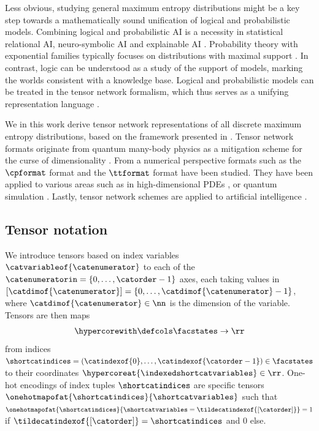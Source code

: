 Less obvious, studying general maximum entropy distributions might be a key step towards a mathematically sound unification of logical and probabilistic models.
Combining logical and probabilistic AI is a necessity in statistical relational AI, neuro-symbolic AI and explainable AI \cite{de_raedt_probabilistic_2008,getoor_introduction_2019,sarker_neuro-symbolic_2022}.
Probability theory with exponential families typically focuses on distributions with maximal support \cite{koller_probabilistic_2009}. %
In contrast, logic can be understood as a study of the support of models, marking the worlds consistent with a knowledge base.
Logical and probabilistic models can be treated in the tensor network formalism, which thus serves as a unifying representation language \cite{goessmann_tensor_2026}.

We in this work derive tensor network representations of all discrete maximum entropy distributions, based on the framework presented in \cite{goessmann_tensor-network_2025,goessmann_tensor_2026}.
Tensor network formats originate from quantum many-body physics \cite{white_density-matrix_1993} as a mitigation scheme for the curse of dimensionality \cite{bellman_adaptive_1961}.
From a numerical perspective \cite{hackbusch_new_2009,hackbusch_tensor_2012} formats such as the $\cpformat$ format \cite{hitchcock_expression_1927,beylkin_algorithms_2005} and the $\ttformat$ format \cite{oseledets_tensor-train_2011} have been studied.
They have been applied to various areas such as in high-dimensional PDEs \cite{eigel_variational_2019,eigel_adaptive_2020}, or quantum simulation \cite{sander_quantum_2025}.
Lastly, tensor network schemes are applied to artificial intelligence \cite{badreddine_logic_2022,domingos_tensor_2025,ali_explicit_2025}.

\subsection{Tensor notation}

We introduce tensors based on index variables $\catvariableof{\catenumerator}$ to each of the $\catenumeratorin=\{0,\ldots,\catorder-1\}$ axes, each taking values in $[\catdimof{\catenumerator}]=\{0,\ldots,\catdimof{\catenumerator}-1\}$, where $\catdimof{\catenumerator}\in\nn$ is the dimension of the variable.
Tensors are then maps
\begin{align*}
    \hypercorewith \defcols \facstates \rightarrow \rr
\end{align*}
from indices $\shortcatindices=(\catindexof{0},\ldots,\catindexof{\catorder-1})\in\facstates$ to their coordinates $\hypercoreat{\indexedshortcatvariables}\in\rr$.
One-hot encodings of index tuples $\shortcatindices$ are specific tensors $\onehotmapofat{\shortcatindices}{\shortcatvariables}$ such that $\onehotmapofat{\shortcatindices}{\shortcatvariables=\tildecatindexof{[\catorder]}}=1$ if $\tildecatindexof{[\catorder]}=\shortcatindices$ and $0$ else.

